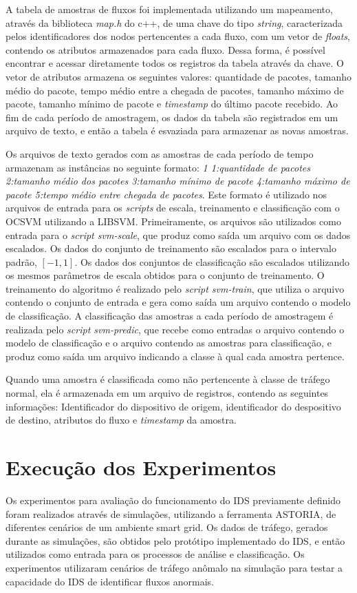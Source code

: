 \documentclass[cic,tc]{iiufrgs}
\begin{document}
A tabela de amostras de fluxos foi implementada utilizando um mapeamento, através da biblioteca \emph{map.h} do c++, de uma chave do tipo \emph{string}, caracterizada pelos identificadores dos nodos pertencentes a cada fluxo, com um vetor de \emph{floats}, contendo os atributos armazenados para cada fluxo. Dessa forma, é possível encontrar e acessar diretamente todos os registros da tabela através da chave. O vetor de atributos armazena os seguintes valores: quantidade de pacotes, tamanho médio do pacote, tempo médio entre a chegada de pacotes, tamanho máximo de pacote, tamanho mínimo de pacote e \emph{timestamp} do último pacote recebido. Ao fim de cada período de amostragem, os dados da tabela são registrados em um arquivo de texto, e então a tabela é esvaziada para armazenar as novas amostras.

Os arquivos de texto gerados com as amostras de cada período de tempo armazenam as instâncias no seguinte formato: \emph{1 1:quantidade de pacotes 2:tamanho médio dos pacotes 3:tamanho mínimo de pacote 4:tamanho máximo de pacote 5:tempo médio entre chegada de pacotes}. Este formato é utilizado nos arquivos de entrada para os \emph{scripts} de escala, treinamento e classificação com o OCSVM utilizando a LIBSVM. Primeiramente, os arquivos são utilizados como entrada para o \emph{script svm-scale}, que produz como saída um arquivo com os dados escalados. Os dados do conjunto de treinamento são escalados para o intervalo padrão, $[-1,1]$. Os dados dos conjuntos de classificação são escalados utilizando os mesmos parâmetros de escala obtidos para o conjunto de treinamento. O treinamento do algoritmo é realizado pelo \emph{script svm-train}, que utiliza o arquivo contendo o conjunto de entrada e gera como saída um arquivo contendo o modelo de classificação. A classificação das amostras a cada período de amostragem é realizada pelo \emph{script svm-predic}, que recebe como entradas o arquivo contendo o modelo de classificação e o arquivo contendo as amostras para classificação, e produz como saída um arquivo indicando a classe à qual cada amostra pertence.

Quando uma amostra é classificada como não pertencente à classe de tráfego normal, ela é armazenada em um arquivo de registros, contendo as seguintes informações: Identificador do dispositivo de origem, identificador do despositivo de destino, atributos do fluxo e \emph{timestamp} da amostra.

\section{Execução dos Experimentos}
\label{sectionexp}
Os experimentos para avaliação do funcionamento do IDS previamente definido foram realizados através de simulações, utilizando a ferramenta ASTORIA, de diferentes cenários de um ambiente smart grid. Os dados de tráfego, gerados durante as simulações, são obtidos pelo protótipo implementado do IDS, e então utilizados como entrada para os processos de análise e classificação. Os experimentos utilizaram cenários de tráfego anômalo na simulação para testar a capacidade do IDS de identificar fluxos anormais.
\end{document}
